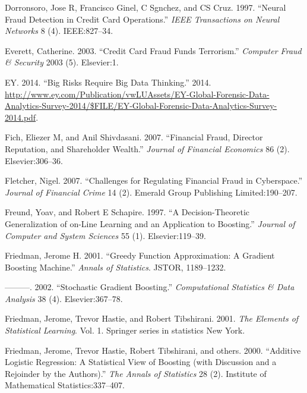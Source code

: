 \documentclass[12pt,]{article}
\begin{document}
\leavevmode\hypertarget{ref-dorronsoro1997neural}{}%
Dorronsoro, Jose R, Francisco Ginel, C Sgnchez, and CS Cruz. 1997.
``Neural Fraud Detection in Credit Card Operations.'' \emph{IEEE
Transactions on Neural Networks} 8 (4). IEEE:827--34.

\leavevmode\hypertarget{ref-everett2003credit}{}%
Everett, Catherine. 2003. ``Credit Card Fraud Funds Terrorism.''
\emph{Computer Fraud \& Security} 2003 (5). Elsevier:1.

\leavevmode\hypertarget{ref-analytics_tools_table}{}%
EY. 2014. ``Big Risks Require Big Data Thinking.'' 2014.
\url{http://www.ey.com/Publication/vwLUAssets/EY-Global-Forensic-Data-Analytics-Survey-2014/$FILE/EY-Global-Forensic-Data-Analytics-Survey-2014.pdf}.

\leavevmode\hypertarget{ref-fich2007financial}{}%
Fich, Eliezer M, and Anil Shivdasani. 2007. ``Financial Fraud, Director
Reputation, and Shareholder Wealth.'' \emph{Journal of Financial
Economics} 86 (2). Elsevier:306--36.

\leavevmode\hypertarget{ref-fletcher2007challenges}{}%
Fletcher, Nigel. 2007. ``Challenges for Regulating Financial Fraud in
Cyberspace.'' \emph{Journal of Financial Crime} 14 (2). Emerald Group
Publishing Limited:190--207.

\leavevmode\hypertarget{ref-freund1997decision}{}%
Freund, Yoav, and Robert E Schapire. 1997. ``A Decision-Theoretic
Generalization of on-Line Learning and an Application to Boosting.''
\emph{Journal of Computer and System Sciences} 55 (1). Elsevier:119--39.

\leavevmode\hypertarget{ref-friedman2001greedy}{}%
Friedman, Jerome H. 2001. ``Greedy Function Approximation: A Gradient
Boosting Machine.'' \emph{Annals of Statistics}. JSTOR, 1189--1232.

\leavevmode\hypertarget{ref-friedman2002stochastic}{}%
---------. 2002. ``Stochastic Gradient Boosting.'' \emph{Computational
Statistics \& Data Analysis} 38 (4). Elsevier:367--78.

\leavevmode\hypertarget{ref-friedman2001elements}{}%
Friedman, Jerome, Trevor Hastie, and Robert Tibshirani. 2001. \emph{The
Elements of Statistical Learning}. Vol. 1. Springer series in statistics
New York.

\leavevmode\hypertarget{ref-friedman2000additive}{}%
Friedman, Jerome, Trevor Hastie, Robert Tibshirani, and others. 2000.
``Additive Logistic Regression: A Statistical View of Boosting (with
Discussion and a Rejoinder by the Authors).'' \emph{The Annals of
Statistics} 28 (2). Institute of Mathematical Statistics:337--407.
\end{document}
